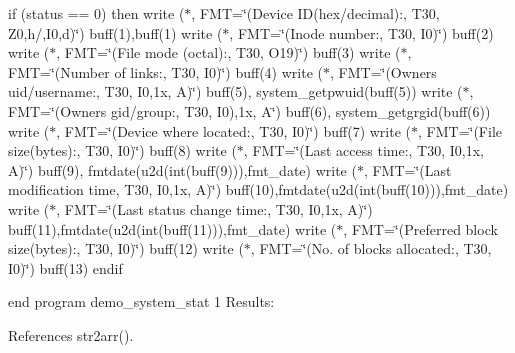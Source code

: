 if (status == 0) then write ($\ast$, F\+MT=\char`\"{}(\textquotesingle{}\+Device I\+D(hex/decimal)\+:\textquotesingle{},      T30, Z0,\textquotesingle{}h/\textquotesingle{},\+I0,\textquotesingle{}d\textquotesingle{})\char`\"{}) buff(1),buff(1) write ($\ast$, F\+MT=\char`\"{}(\textquotesingle{}\+Inode number\+:\textquotesingle{},                T30, I0)\char`\"{}) buff(2) write ($\ast$, F\+MT=\char`\"{}(\textquotesingle{}\+File mode (octal)\+:\textquotesingle{},           T30, O19)\char`\"{}) buff(3) write ($\ast$, F\+MT=\char`\"{}(\textquotesingle{}\+Number of links\+:\textquotesingle{},             T30, I0)\char`\"{}) buff(4) write ($\ast$, F\+MT=\char`\"{}(\textquotesingle{}\+Owner\textquotesingle{}\textquotesingle{}s uid/username\+:\textquotesingle{},       T30, I0,1x, A)\char`\"{}) buff(5), system\+\_\+getpwuid(buff(5)) write ($\ast$, F\+MT=\char`\"{}(\textquotesingle{}\+Owner\textquotesingle{}\textquotesingle{}s gid/group\+:\textquotesingle{},          T30, I0),1x, A\char`\"{}) buff(6), system\+\_\+getgrgid(buff(6)) write ($\ast$, F\+MT=\char`\"{}(\textquotesingle{}\+Device where located\+:\textquotesingle{},        T30, I0)\char`\"{}) buff(7) write ($\ast$, F\+MT=\char`\"{}(\textquotesingle{}\+File size(bytes)\+:\textquotesingle{},            T30, I0)\char`\"{}) buff(8) write ($\ast$, F\+MT=\char`\"{}(\textquotesingle{}\+Last access time\+:\textquotesingle{},            T30, I0,1x, A)\char`\"{}) buff(9), fmtdate(u2d(int(buff(9))),fmt\+\_\+date) write ($\ast$, F\+MT=\char`\"{}(\textquotesingle{}\+Last modification time\textquotesingle{},       T30, I0,1x, A)\char`\"{}) buff(10),fmtdate(u2d(int(buff(10))),fmt\+\_\+date) write ($\ast$, F\+MT=\char`\"{}(\textquotesingle{}\+Last status change time\+:\textquotesingle{},     T30, I0,1x, A)\char`\"{}) buff(11),fmtdate(u2d(int(buff(11))),fmt\+\_\+date) write ($\ast$, F\+MT=\char`\"{}(\textquotesingle{}\+Preferred block size(bytes)\+:\textquotesingle{}, T30, I0)\char`\"{}) buff(12) write ($\ast$, F\+MT=\char`\"{}(\textquotesingle{}\+No. of blocks allocated\+:\textquotesingle{},     T30, I0)\char`\"{}) buff(13) endif

end program demo\+\_\+system\+\_\+stat 1 Results\+: 

References str2arr().

\mbox{\label{namespacem__system_aa26c234da8b559f549db4dbe446b8acc}} 
